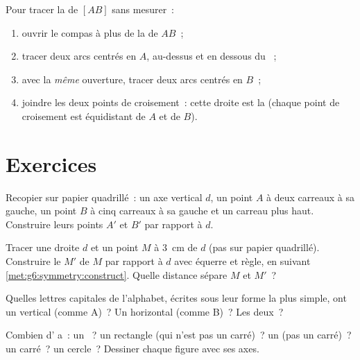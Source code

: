 \begin{method}\label{met:g6:symmetry:bisector}
Pour tracer la  de $[AB]$ sans mesurer~:
\begin{enumerate}
  \item ouvrir le compas à plus de la  de $AB$~;
  \item tracer deux arcs centrés en $A$, au-dessus et en dessous du
        ~;
  \item avec la \emph{même} ouverture, tracer deux arcs centrés en
        $B$~;
  \item joindre les deux points de croisement~: cette droite est la
         (chaque point de croisement est équidistant de $A$
        et de $B$).
\end{enumerate}
\end{method}

\section{Exercices}

\begin{exercise}[$\star$]\label{exo:g6:symmetry:1}
Recopier sur papier quadrillé~: un axe vertical $d$, un point $A$ à
deux carreaux à sa gauche, un point $B$ à cinq carreaux à sa gauche et
un carreau plus haut. Construire leurs points  $A'$ et
$B'$ par rapport à $d$.
\end{exercise}

\begin{exercise}[$\star$]\label{exo:g6:symmetry:2}
Tracer une droite $d$ et un point $M$ à $3$~cm de $d$ (pas sur
papier quadrillé). Construire le  $M'$ de $M$ par rapport à
$d$ avec équerre et règle, en suivant
\cref{met:g6:symmetry:construct}. Quelle distance sépare $M$ et
$M'$~?
\end{exercise}

\begin{exercise}[$\star$]\label{exo:g6:symmetry:3}
Quelles lettres capitales de l'alphabet, écrites sous leur forme la
plus simple, ont un  vertical (comme A)~? Un horizontal
(comme B)~? Les deux~?
\end{exercise}

\begin{exercise}[$\star$]\label{exo:g6:symmetry:4}
Combien d' a~: un ~? un rectangle
(qui n'est pas un carré)~? un  (pas un carré)~? un carré~? un
cercle~? Dessiner chaque figure avec ses axes.
\end{exercise}

